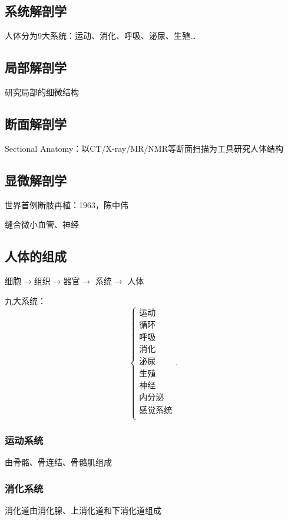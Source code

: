 \subsection*{系统解剖学}%
\label{sub:系统解剖学}
人体分为9大系统：运动、消化、呼吸、泌尿、生殖\ldots
\subsection*{局部解剖学}%
\label{sub:局部解剖学}
研究局部的细微结构
\subsection*{断面解剖学}%
\label{sub:断面解剖学}
Sectional Anatomy：以CT/X-ray/MR/NMR等断面扫描为工具研究人体结构
\subsection*{显微解剖学}%
\label{sub:显微解剖学}
\begin{notation}
    世界首例断肢再植：1963，陈中伟
\end{notation}
缝合微小血管、神经

\subsection{人体的组成}%
\label{sub:人体的组成}
细胞$\to $组织$\to $器官$\to $ 系统$\to $ 人体

九大系统：
\[
    \begin{cases}
        \mbox{运动}\\
        \mbox{循环}\\
        \mbox{呼吸}\\
        \mbox{消化}\\
        \mbox{泌尿}\\
        \mbox{生殖}\\
        \mbox{神经}\\
        \mbox{内分泌}\\
        \mbox{感觉系统}\\
    \end{cases}
.\] 
\subsubsection*{运动系统}%
\label{subsub:运动系统}
由骨骼、骨连结、骨骼肌组成
\subsubsection*{消化系统}%
\label{subsub:消化系统}
消化道由消化腺、上消化道和下消化道组成
